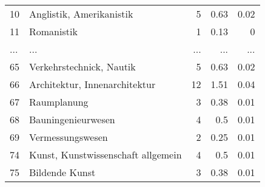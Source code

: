 \begin{longtable}{lXrrr}
        10 & \multicolumn{1}{X}{Anglistik, Amerikanistik} & %
          \num{5} &
          \num[round-mode=places,round-precision=2]{0.63} &
          \num[round-mode=places,round-precision=2]{0.02} \\
        11 & \multicolumn{1}{X}{Romanistik} & %
          \num{1} &
          \num[round-mode=places,round-precision=2]{0.13} &
          \num[round-mode=places,round-precision=2]{0} \\
       ... & ... & ... & ... & ... \\
        65 & \multicolumn{1}{X}{Verkehrstechnick, Nautik} & %
          \num{5} &
          \num[round-mode=places,round-precision=2]{0.63} &
          \num[round-mode=places,round-precision=2]{0.02} \\

        66 & \multicolumn{1}{X}{Architektur, Innenarchitektur} & %
          \num{12} &
          \num[round-mode=places,round-precision=2]{1.51} &
          \num[round-mode=places,round-precision=2]{0.04} \\

        67 & \multicolumn{1}{X}{Raumplanung} & %
          \num{3} &
          \num[round-mode=places,round-precision=2]{0.38} &
          \num[round-mode=places,round-precision=2]{0.01} \\

        68 & \multicolumn{1}{X}{Bauningenieurwesen} & %
          \num{4} &
          \num[round-mode=places,round-precision=2]{0.5} &
          \num[round-mode=places,round-precision=2]{0.01} \\

        69 & \multicolumn{1}{X}{Vermessungswesen} & %
          \num{2} &
          \num[round-mode=places,round-precision=2]{0.25} &
          \num[round-mode=places,round-precision=2]{0.01} \\

        74 & \multicolumn{1}{X}{Kunst, Kunstwissenschaft allgemein} & %
          \num{4} &
          \num[round-mode=places,round-precision=2]{0.5} &
          \num[round-mode=places,round-precision=2]{0.01} \\

        75 & \multicolumn{1}{X}{Bildende Kunst} & %
          \num{3} &
          \num[round-mode=places,round-precision=2]{0.38} &
          \num[round-mode=places,round-precision=2]{0.01} \\


\end{longtable}
